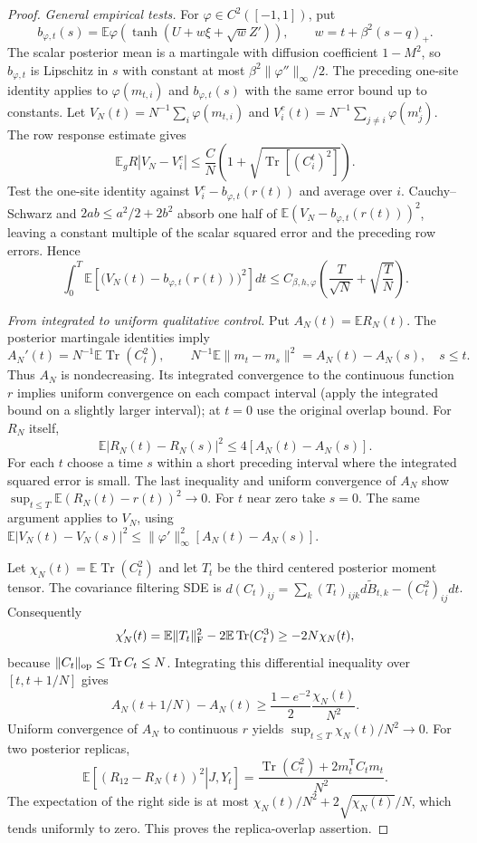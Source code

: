 \documentclass[11pt,reqno]{amsart}
\begin{document}
\begin{proof}
\medskip\noindent\emph{General empirical tests.}
For $\varphi\in C^2([-1,1])$, put
\[
 b_{\varphi,t}(s)=\mathbb E\varphi\!
   \left(\tanh(U+w\xi+\sqrt w Z')\right),\qquad
 w=t+\beta^2(s-q)_+.
\]
The scalar posterior mean is a martingale with diffusion coefficient
$1-M^2$, so $b_{\varphi,t}$ is Lipschitz in $s$ with constant at most
$\beta^2\|\varphi''\|_\infty/2$.
The preceding one-site identity applies to $\varphi(m_{t,i})$ and
$b_{\varphi,t}(s)$ with the same error bound up to constants.
Let $V_N(t)=N^{-1}\sum_i\varphi(m_{t,i})$ and
$V_i^c(t)=N^{-1}\sum_{j\ne i}\varphi(m_{j}^t)$.
The row response estimate gives
\[
 \mathbb E_g R|V_N-V_i^c|
 \le\frac C N\left(1+\sqrt{\operatorname{Tr}[(C_i^t)^2]}\right).
\]
Test the one-site identity against
$V_i^c-b_{\varphi,t}(r(t))$ and average over $i$.
Cauchy--Schwarz and $2ab\le a^2/2+2b^2$ absorb one half of
$\mathbb E(V_N-b_{\varphi,t}(r(t)))^2$, leaving a constant multiple of
the scalar squared error and the preceding row errors. Hence
\[
 \int_0^T\mathbb E\left[\bigl(V_N(t)-b_{\varphi,t}(r(t))\bigr)^2\right]dt
 \le C_{\beta,h,\varphi}\left(\frac T{\sqrt N}+\sqrt{\frac TN}\right).
\]

\medskip\noindent\emph{From integrated to uniform qualitative control.}
Put $A_N(t)=\mathbb E R_N(t)$.
The posterior martingale identities imply
\[
 A_N'(t)=N^{-1}\mathbb E\operatorname{Tr}(C_t^2),\qquad
 N^{-1}\mathbb E\|m_t-m_s\|^2=A_N(t)-A_N(s),\quad s\le t.
\]
Thus $A_N$ is nondecreasing. Its integrated convergence to the continuous
function $r$ implies uniform convergence on each compact interval (apply the integrated bound on a slightly larger interval); at
$t=0$ use the original overlap bound.  For $R_N$ itself,
\[
 \mathbb E|R_N(t)-R_N(s)|^2\le4[A_N(t)-A_N(s)].
\]
For each $t$ choose a time $s$ within a short preceding interval where the
integrated squared error is small. The last inequality and uniform
convergence of $A_N$ show
$\sup_{t\le T}\mathbb E(R_N(t)-r(t))^2\to0$.
For $t$ near zero take $s=0$. The same argument applies to $V_N$, using
$\mathbb E|V_N(t)-V_N(s)|^2
\le\|\varphi'\|_\infty^2[A_N(t)-A_N(s)]$.

Let $\chi_N(t)=\mathbb E\operatorname{Tr}(C_t^2)$ and let $T_t$ be the
third centered posterior moment tensor. The covariance filtering SDE is
$d(C_t)_{ij}=\sum_k(T_t)_{ijk}d\widetilde B_{t,k}-(C_t^2)_{ij}dt$.
Consequently
\[
 \chi_N'(t)=\mathbb E\|T_t\|_{\rm F}^2
               -2\mathbb E\operatorname{Tr}(C_t^3)
 \ge-2N\chi_N(t),
\]
because $\|C_t\|_{\rm op}\le\operatorname{Tr}C_t\le N$.
Integrating this differential inequality over $[t,t+1/N]$ gives
\[
 A_N(t+1/N)-A_N(t)
 \ge\frac{1-e^{-2}}2\frac{\chi_N(t)}{N^2}.
\]
Uniform convergence of $A_N$ to continuous $r$ yields
$\sup_{t\le T}\chi_N(t)/N^2\to0$.
For two posterior replicas,
\[
 \mathbb E\left[\left.(R_{12}-R_N(t))^2\right|J,Y_t\right]
 =\frac{\operatorname{Tr}(C_t^2)+2m_t^{\mathsf T}C_tm_t}{N^2}.
\]
The expectation of the right side is at most
$\chi_N(t)/N^2+2\sqrt{\chi_N(t)}/N$, which tends uniformly to zero.
This proves the replica-overlap assertion.


\end{proof}
\end{document}
